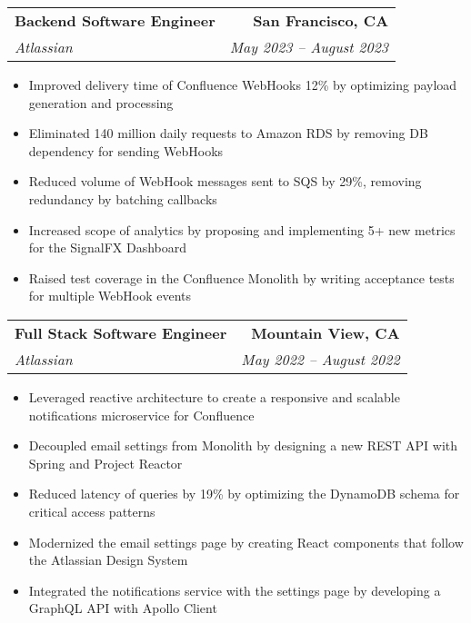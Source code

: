 \documentclass[letterpaper,11pt]{article}
\makeatletter
\newcommand{\resumeItem}[1]{
  \item\small{
    {#1 \vspace{-2pt}}
  }
}
\newcommand{\resumeSubheading}[4]{
  \vspace{-2pt}\item
    \begin{tabular*}{0.97\textwidth}[t]{l@{\extracolsep{\fill}}r}
      \textbf{#1} & #2 \\
      \textit{\small#3} & \textit{\small #4} \\
    \end{tabular*}\vspace{-7pt}
}
\newcommand{\resumeSubSubheading}[2]{
    \item
    \begin{tabular*}{0.97\textwidth}{l@{\extracolsep{\fill}}r}
      \textit{\small#1} & \textit{\small #2} \\
    \end{tabular*}\vspace{-7pt}
}
\newcommand{\resumeSubHeadingListEnd}{\end{itemize}}
\newcommand{\resumeItemListStart}{\begin{itemize}}
\newcommand{\resumeItemListEnd}{\end{itemize}\vspace{-5pt}}
\makeatother
\begin{document}

    \resumeSubheading
      {Backend Software Engineer}{\textbf{San Francisco, CA}}
      {Atlassian}{May 2023 -- August 2023}
      \resumeItemListStart
        \resumeItem{Improved delivery time of Confluence WebHooks 12\% by optimizing payload generation and processing}
        \resumeItem{Eliminated 140 million daily requests to Amazon RDS by removing DB dependency for sending WebHooks}
        \resumeItem{Reduced volume of WebHook messages sent to SQS by 29\%, removing redundancy by batching callbacks}
        \resumeItem{Increased scope of analytics by proposing and implementing 5+ new metrics for the SignalFX Dashboard}
        \resumeItem{Raised test coverage in the Confluence Monolith by writing acceptance tests for multiple WebHook events}
      \resumeItemListEnd

    \resumeSubheading
      {Full Stack Software Engineer}{\textbf{Mountain View, CA}}
      {Atlassian}{May 2022 -- August 2022}
      \resumeItemListStart
        \resumeItem{Leveraged reactive architecture to create a responsive and scalable notifications microservice for Confluence}
        \resumeItem{Decoupled email settings from Monolith by designing a new REST API with Spring and Project Reactor}
        \resumeItem{Reduced latency of queries by 19\% by optimizing the DynamoDB schema for critical access patterns}
        \resumeItem{Modernized the email settings page by creating React components that follow the Atlassian Design System}
        \resumeItem{Integrated the notifications service with the settings page by developing a GraphQL API with Apollo Client}
      \resumeItemListEnd
      
\end{document}
